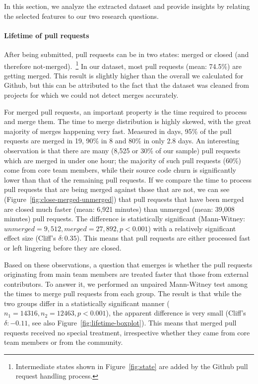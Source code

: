 \documentclass{acm_proc_article-sp}
\begin{document}
In this section, we analyze the extracted dataset and provide insights
by relating the selected features to our two research questions.

\paragraph*{Lifetime of pull requests}

After being submitted, pull requests can be in two states: merged or closed
(and therefore not-merged).~\footnote{Intermediate states shown in
Figure~\ref{fig:state} are added by the Github pull request handling process.} 
In our dataset, most pull requests (mean: 74.5\%) are getting
merged. This result is slightly higher than the overall we calculated for
Github, but this can be attributed to the fact that the dataset was cleaned
from projects for which we could not detect merges accurately. 

For merged pull requests, an important property is the time required to process
and merge them. The time to merge distribution is highly skewed, with the great
majority of merges happening very fast. Measured in days, 95\% of the pull
requests are merged in 19, 90\% in 8 and 80\% in only 2.8 days. An interesting
observation is that there are many (8,525 or 30\% of our sample) pull requests
which are merged in under one hour; the majority of such pull requests (60\%)
come from core team members, while their source code churn is significantly
lower than that of the remaining pull requests. If we compare the time to
process pull requests that are being merged against those that are not, we can
see (Figure~\ref{fig:close-merged-unmerged}) that pull requests that have been
merged are closed much faster (mean: 6,921 minutes) than unmerged (mean: 39,008
minutes) pull requests. The difference is statistically significant
(Mann-Witney: $unmerged = 9,512, merged = 27,892, p < 0.001$) with a relatively
significant effect size (Cliff's $\delta: 0.35$). This means that pull requests
are either processed fast or left lingering before they are closed.

Based on these observations, a question that emerges is
whether the pull requests originating from main team members are treated faster
that those from external contributors. To answer it, we performed an unpaired
Mann-Witney test among the times to merge pull requests from each group. The
result is that while the two groups differ in a statistically significant manner
($n_1 = 14316, n_2 = 12463, p < 0.001$), the apparent difference is very small
(Cliff's $\delta: -0.11$, see also Figure~\ref{fig:lifetime-boxplot}). This
means that merged pull requests received no special treatment, irrespective
whether they came from core team members or from the community.
\end{document}
